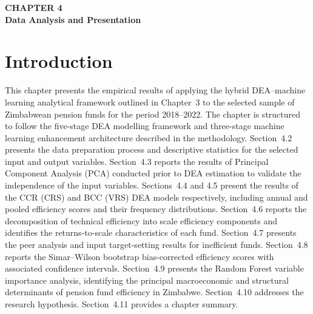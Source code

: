 \documentclass[12pt,a4paper]{article}
\begin{document}
\begin{center}
    {\LARGE\bfseries CHAPTER 4}\\[0.5cm]
    {\Large\bfseries Data Analysis and Presentation}
\end{center}
\setcounter{section}{0}
\renewcommand{\thesection}{4.\arabic{section}}
{}

\vspace{1cm}

\section{Introduction}

This chapter presents the empirical results of applying the hybrid DEA--machine learning analytical framework outlined in Chapter~3 to the selected sample of Zimbabwean pension funds for the period 2018--2022. The chapter is structured to follow the five-stage DEA modelling framework and three-stage machine learning enhancement architecture described in the methodology. Section~4.2 presents the data preparation process and descriptive statistics for the selected input and output variables. Section~4.3 reports the results of Principal Component Analysis (PCA) conducted prior to DEA estimation to validate the independence of the input variables. Sections~4.4 and 4.5 present the results of the CCR (CRS) and BCC (VRS) DEA models respectively, including annual and pooled efficiency scores and their frequency distributions. Section~4.6 reports the decomposition of technical efficiency into scale efficiency components and identifies the returns-to-scale characteristics of each fund. Section~4.7 presents the peer analysis and input target-setting results for inefficient funds. Section~4.8 reports the Simar--Wilson bootstrap bias-corrected efficiency scores with associated confidence intervals. Section~4.9 presents the Random Forest variable importance analysis, identifying the principal macroeconomic and structural determinants of pension fund efficiency in Zimbabwe. Section~4.10 addresses the research hypothesis. Section~4.11 provides a chapter summary.

\end{document}
